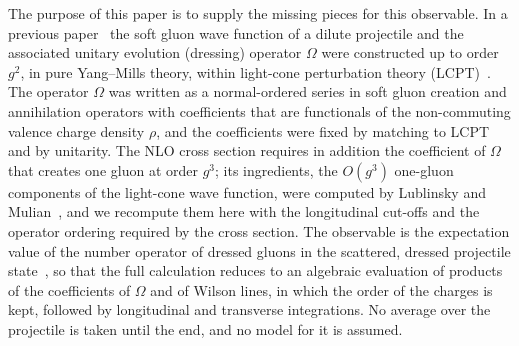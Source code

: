 The purpose of this paper is to supply the missing pieces for this observable. In a previous paper~\cite{Radhakrishnan:2026soft} the soft gluon wave function of a dilute projectile and the associated unitary evolution (dressing) operator $\Omega$ were constructed up to order $g^2$, in pure Yang--Mills theory, within light-cone perturbation theory (LCPT)~\cite{Lepage:1980fj,Brodsky:1997de}. The operator $\Omega$ was written as a normal-ordered series in soft gluon creation and annihilation operators with coefficients that are functionals of the non-commuting valence charge density $\rho$, and the coefficients were fixed by matching to LCPT and by unitarity. The NLO cross section requires in addition the coefficient of $\Omega$ that creates one gluon at order $g^3$; its ingredients, the $O(g^3)$ one-gluon components of the light-cone wave function, were computed by Lublinsky and Mulian~\cite{Lublinsky:2016meo}, and we recompute them here with the longitudinal cut-offs and the operator ordering required by the cross section. The observable is the expectation value of the number operator of dressed gluons in the scattered, dressed projectile state~\cite{Kovner:2006wr}, so that the full calculation reduces to an algebraic evaluation of products of the coefficients of $\Omega$ and of Wilson lines, in which the order of the charges is kept, followed by longitudinal and transverse integrations. No average over the projectile is taken until the end, and no model for it is assumed.

